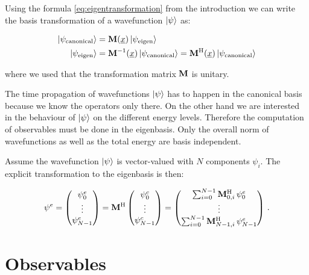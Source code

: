 Using the formula \eqref{eq:eigentransformation} from the introduction we can
write the basis transformation of a wavefunction $\Ket{\psi}$ as:

\begin{equation} \label{eq:basis_trafos_wf}
\begin{split}
  \Ket{\psi_\text{canonical}} & = \mathbf{M}(\underline{x}) \Ket{\psi_\text{eigen}} \\
  \Ket{\psi_\text{eigen}}     & = \mathbf{M}{}^{-1}(\underline{x}) \Ket{\psi_\text{canonical}} = \mathbf{M}{}^{\textnormal{H}}(\underline{x}) \Ket{\psi_\text{canonical}}
\end{split}
\end{equation}

where we used that the transformation matrix $\mathbf{M}$ is unitary.

The time propagation of wavefunctions $\Ket{\psi}$ has to happen in the canonical
basis because we know the operators only there. On the other hand we are interested
in the behaviour of $\Ket{\psi}$ on the different energy levels. Therefore the
computation of observables must be done in the eigenbasis. Only the overall norm
of wavefunctions as well as the total energy are basis independent.

Assume the wavefunction $\Ket{\psi}$ is vector-valued with $N$ components
$\psi_i$. The explicit transformation to the eigenbasis is then:

\begin{equation*}
  \psi^{e} =
  \begin{pmatrix}
    \psi^{e}_0 \\
    \vdots \\
    \psi^{e}_{N-1}
  \end{pmatrix}
  =
  \mathbf{M}{}^{\textnormal{H}}
  \begin{pmatrix}
    \psi^{c}_0 \\
    \vdots \\
    \psi^{c}_{N-1}
  \end{pmatrix}
  =
  \begin{pmatrix}
    \sum_{i=0}^{N-1} \mathbf{M}{}^{\textnormal{H}}_{0,i} \, \psi^{e}_0 \\
    \vdots \\
    \sum_{i=0}^{N-1} \mathbf{M}{}^{\textnormal{H}}_{N-1,i} \, \psi^{e}_{N-1}
  \end{pmatrix} \,.
\end{equation*}


\section{Observables}

